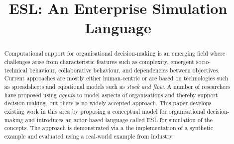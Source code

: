 \documentclass[10pt,numbers]{sigplanconf}
\begin{document}
\setlength{\pdfpageheight}{\paperheight}
\setlength{\pdfpagewidth}{\paperwidth}




\title{ESL: An Enterprise Simulation Language}



\maketitle

\begin{abstract}
Computational support for organisational decision-making is an emerging field where challenges arise from characteristic features such as complexity, emergent socio-technical behaviour, collaborative behaviour, and dependencies between objectives. Current approaches are mostly either human-centric or are based on technologies such as spreadsheets and equational models such as {\it stock and flow}. A number of researchers have proposed using {\it agents} to model aspects of organisations and thereby support decision-making, but there is no widely accepted approach. This paper develops existing work in this area by proposing a conceptual model for organisational decision-making and introduces an actor-based language called ESL for simulation of the concepts. The approach is demonstrated via a the implementation of a synthetic example and evaluated using a real-world example from industry.
\end{abstract}
\end{document}
